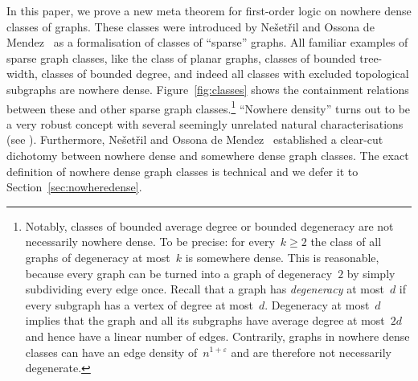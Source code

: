 \documentclass[11pt]{article}
\numberwithin{equation}{section}
\renewcommand{\epsilon}{\varepsilon}
\begin{document}
In this paper, we prove a new meta theorem for first-order logic on
nowhere dense classes of graphs. These classes were introduced by Ne\v
set\v ril and Ossona de Mendez~\cite{NesetrilOdM12,NesetrilO11} as a
formalisation of classes of ``sparse'' graphs. All familiar examples
of sparse graph classes, like the class of planar graphs, classes of
bounded tree-width, classes of bounded degree, and indeed all classes
with excluded topological subgraphs are nowhere
dense. Figure~\ref{fig:classes} shows the containment relations
between these and other sparse graph classes.\footnote{Notably,
  classes of bounded average degree or bounded degeneracy are not
  necessarily nowhere dense. To be precise: for every~$k\ge 2$ the
  class of all graphs of degeneracy at most~$k$ is somewhere
  dense. This is reasonable, because every graph can be turned into a
  graph of degeneracy~$2$ by simply subdividing every edge
  once. Recall that a graph has \emph{degeneracy} at most~$d$ if every
  subgraph has a vertex of degree at most~$d$. Degeneracy at most~$d$
  implies that the graph and all its subgraphs have average degree at
  most~$2d$ and hence have a linear number of edges. Contrarily,
  graphs in nowhere dense classes can have an edge density
  of~$n^{1+\epsilon}$ and are therefore not necessarily degenerate.}
``Nowhere density'' turns out to be a very robust concept with several
seemingly unrelated natural characterisations (see
\cite{NesetrilOdM12,NesetrilO11}). Furthermore, Ne\v set\v ril and
Ossona de Mendez~\cite{NesetrilO11} established a clear-cut dichotomy
between nowhere dense and somewhere dense graph classes. The exact
definition of nowhere dense graph classes is
technical %
and we defer it to Section~\ref{sec:nowheredense}.
\end{document}
